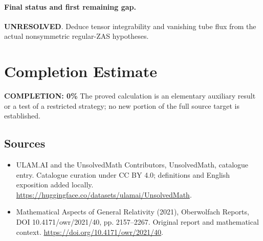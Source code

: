 \documentclass[11pt]{article}
\begin{document}
\paragraph{Final status and first remaining gap.}
\textbf{UNRESOLVED}. Deduce tensor integrability and vanishing tube flux from the actual nonsymmetric regular-ZAS hypotheses.

\section{Completion Estimate}
\noindent\textbf{COMPLETION: 0\%}
The proved calculation is an elementary auxiliary result or a test of a restricted strategy; no new portion of the full source target is established.

\subsection{Sources}
\begin{itemize}
\item[\hypertarget{source:statement:1}{S1}] ULAM.AI and the UnsolvedMath Contributors, UnsolvedMath, catalogue entry. Catalogue curation under CC BY 4.0; definitions and English exposition added locally.
\url{https://huggingface.co/datasets/ulamai/UnsolvedMath}.
\item[\hypertarget{source:statement:2}{S2}] Mathematical Aspects of General Relativity (2021), Oberwolfach Reports, DOI 10.4171/owr/2021/40, pp. 2157--2267. Original report and mathematical context.
\url{https://doi.org/10.4171/owr/2021/40}.
\end{itemize}
\label{end:statement}
\end{document}
